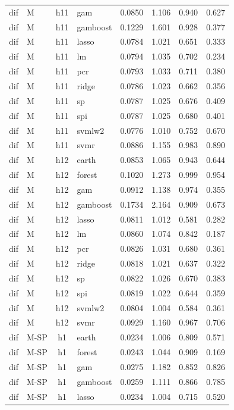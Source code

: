 \begin{ThreePartTable}
\begin{longtable}[t]{llclcccc}
dif & M & h11 & gam & 0.0850 & 1.106 & 0.940 & 0.627\\
dif & M & h11 & gamboost & 0.1229 & 1.601 & 0.928 & 0.377\\
dif & M & h11 & lasso & 0.0784 & 1.021 & 0.651 & 0.333\\
dif & M & h11 & lm & 0.0794 & 1.035 & 0.702 & 0.234\\
dif & M & h11 & pcr & 0.0793 & 1.033 & 0.711 & 0.380\\
dif & M & h11 & ridge & 0.0786 & 1.023 & 0.662 & 0.356\\
dif & M & h11 & sp & 0.0787 & 1.025 & 0.676 & 0.409\\
dif & M & h11 & spi & 0.0787 & 1.025 & 0.680 & 0.401\\
dif & M & h11 & svmlw2 & 0.0776 & 1.010 & 0.752 & 0.670\\
dif & M & h11 & svmr & 0.0886 & 1.155 & 0.983 & 0.890\\
\addlinespace
dif & M & h12 & earth & 0.0853 & 1.065 & 0.943 & 0.644\\
dif & M & h12 & forest & 0.1020 & 1.273 & 0.999 & 0.954\\
dif & M & h12 & gam & 0.0912 & 1.138 & 0.974 & 0.355\\
dif & M & h12 & gamboost & 0.1734 & 2.164 & 0.909 & 0.673\\
dif & M & h12 & lasso & 0.0811 & 1.012 & 0.581 & 0.282\\
dif & M & h12 & lm & 0.0860 & 1.074 & 0.842 & 0.187\\
dif & M & h12 & pcr & 0.0826 & 1.031 & 0.680 & 0.361\\
dif & M & h12 & ridge & 0.0818 & 1.021 & 0.637 & 0.322\\
dif & M & h12 & sp & 0.0822 & 1.026 & 0.670 & 0.383\\
dif & M & h12 & spi & 0.0819 & 1.022 & 0.644 & 0.359\\
dif & M & h12 & svmlw2 & 0.0804 & 1.004 & 0.584 & 0.361\\
dif & M & h12 & svmr & 0.0929 & 1.160 & 0.967 & 0.706\\
\addlinespace
dif & M-SP & h1 & earth & 0.0234 & 1.006 & 0.809 & 0.571\\
dif & M-SP & h1 & forest & 0.0243 & 1.044 & 0.909 & 0.169\\
dif & M-SP & h1 & gam & 0.0275 & 1.182 & 0.852 & 0.826\\
dif & M-SP & h1 & gamboost & 0.0259 & 1.111 & 0.866 & 0.785\\
dif & M-SP & h1 & lasso & 0.0234 & 1.004 & 0.715 & 0.520\\

\end{longtable}
\end{ThreePartTable}
